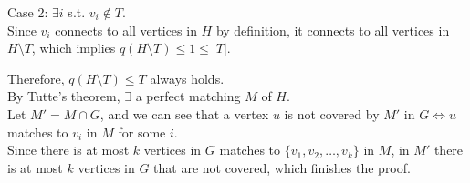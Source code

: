\begin{pr}
Case 2: $\exists i$ s.t. $v_i\notin T$.\\
Since $v_i$ connects to all vertices in $H$ by definition, it connects to all vertices in $H\setminus T$, which implies $q(H\setminus T)\leq1\leq|T|$.

Therefore, $q(H\setminus T)\leq T$ always holds.\\
By Tutte's theorem, $\exists$ a perfect matching $M$ of $H$.\\
Let $M'=M\cap G$, and we can see that a vertex $u$ is not covered by $M'$ in $G\iff u$ matches to $v_i$ in $M$ for some $i$.\\
Since there is at most $k$ vertices in $G$ matches to $\{v_1, v_2, \dots, v_k\}$ in $M$, in $M'$ there is at most $k$ vertices in $G$ that are not covered, which finishes the proof.
\end{pr}

